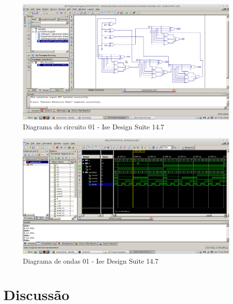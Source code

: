 \documentclass[12pts]{article}
\begin{document}
\begin{figure}[!htb]
  \centering
  \includegraphics[scale=0.2]{img/subtrator}
  \caption{Diagrama do circuito 01 - Ise Design Suite 14.7}
  \label{figRotulo}
\end{figure}

\begin{figure}[!htb]
  \centering
  \includegraphics[scale=0.2]{img/subtratorSaida.png}
  \caption{Diagrama de ondas 01 - Ise Design Suite 14.7}
  \label{figRotulo}
\end{figure}

\newpage


\section{Discussão}

\end{document}
